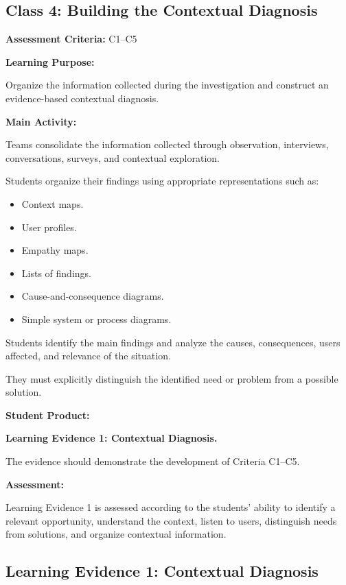 \documentclass[12pt,a4paper]{article}
\begin{document}
	\subsection{Class 4: Building the Contextual Diagnosis}
	
	\textbf{Assessment Criteria:} C1--C5
	
	\textbf{Learning Purpose:}
	
	Organize the information collected during the investigation and construct an evidence-based contextual diagnosis.
	
	\textbf{Main Activity:}
	
	Teams consolidate the information collected through observation, interviews, conversations, surveys, and contextual exploration.
	
	Students organize their findings using appropriate representations such as:
	
	\begin{itemize}
		\item Context maps.
		\item User profiles.
		\item Empathy maps.
		\item Lists of findings.
		\item Cause-and-consequence diagrams.
		\item Simple system or process diagrams.
	\end{itemize}
	
	Students identify the main findings and analyze the causes, consequences, users affected, and relevance of the situation.
	
	They must explicitly distinguish the identified need or problem from a possible solution.
	
	\textbf{Student Product:}
	
	\textbf{Learning Evidence 1: Contextual Diagnosis.}
	
	The evidence should demonstrate the development of Criteria C1--C5.
	
	\textbf{Assessment:}
	
	Learning Evidence 1 is assessed according to the students' ability to identify a relevant opportunity, understand the context, listen to users, distinguish needs from solutions, and organize contextual information.
	
	
	\subsection{Learning Evidence 1: Contextual Diagnosis}
	
\end{document}

